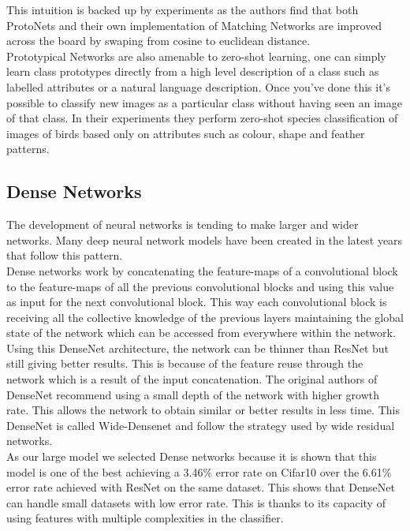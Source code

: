                     This intuition is backed up by experiments as the authors find that both ProtoNets and their own implementation of Matching Networks are improved across the board by swaping from cosine to euclidean distance. \\

Prototypical Networks are also amenable to zero-shot learning, one can simply learn class prototypes directly from a high level description of a class such as labelled attributes or a natural language description. Once you’ve done this it’s possible to classify new images as a particular class without having seen an image of that class. In their experiments they perform zero-shot species classification of images of birds based only on attributes such as colour, shape and feather patterns.

\subsection{Dense Networks}

The development of neural networks is tending to make larger and wider networks. Many deep neural network models have been created in the latest years that follow this pattern. \\

Dense networks \cite{densenet} work by concatenating the feature-maps of a convolutional block to the feature-maps of all the previous convolutional blocks and using this value as input for the next convolutional block. This way each convolutional block is receiving all the collective knowledge of the previous layers maintaining the global state of the network which can be accessed from everywhere within the network. \\

Using this DenseNet architecture, the network can be thinner than ResNet but still giving better results. This is because of the feature reuse through the network which is a result of the input concatenation.
The original authors of DenseNet recommend using a small depth of the network with higher growth rate. This allows the network to obtain similar or better results in less time. This DenseNet is called Wide-Densenet and follow the strategy used by wide residual networks\cite{wide_resnet}.  \\

As our large model we selected Dense networks because it is shown that this model is one of the best achieving a 3.46\% error rate on Cifar10 over the 6.61\% error rate achieved with ResNet on the same dataset\cite{densenet_cifar}. This shows that DenseNet can handle small datasets with low error rate. This is thanks to its capacity of using features with multiple complexities in the classifier. \\

